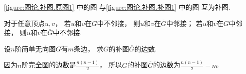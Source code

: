 \cref{figure:图论.补图.原图1} 中的图
与\cref{figure:图论.补图.补图1} 中的图
互为补图.

\begin{proposition}
对于任意顶点\(u,v\)，
若\(u\)和\(v\)在\(G\)中不邻接，
则\(u\)和\(v\)在\(\overline{G}\)中邻接；
若\(u\)和\(v\)在\(G\)中邻接，
则\(u\)和\(v\)在\(\overline{G}\)中不邻接.
\end{proposition}

\begin{example}
设\(n\)阶简单无向图\(G\)有\(m\)条边，
求\(G\)的补图\(\overline{G}\)的边数.
\begin{solution}
因为\(n\)阶完全图的边数是\(\frac{n(n-1)}2\)，
所以\(G\)的补图\(\overline{G}\)的边数为\(\frac{n(n-1)}2-m\).
\end{solution}
\end{example}
